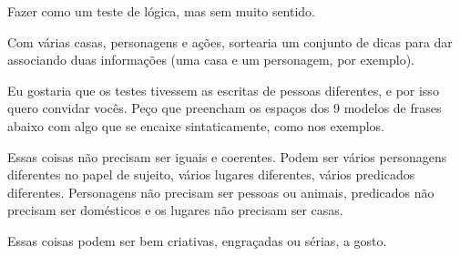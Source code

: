 \documentclass[12pt]{article}
\begin{document}
	Fazer como um teste de lógica, mas sem muito sentido. 
	
	Com várias casas, personagens e ações, sortearia um conjunto de dicas para dar associando duas informações (uma casa e um personagem, por exemplo).
	
	Eu gostaria que os testes tivessem as escritas de pessoas diferentes, e por isso quero convidar vocês. 
	Peço que preencham os espaços dos 9 modelos de frases abaixo com algo que se encaixe sintaticamente, como nos exemplos.
	
	Essas coisas não precisam ser iguais e coerentes. 
	Podem ser vários personagens diferentes no papel de sujeito, vários lugares diferentes, vários predicados diferentes. 
	Personagens não precisam ser pessoas ou animais, predicados não precisam ser domésticos e os lugares não precisam ser casas. 
	
	Essas coisas podem ser bem criativas, engraçadas ou sérias, a gosto.
	
\end{document}
